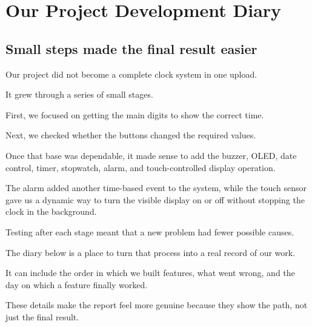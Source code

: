 \documentclass[12pt,letterpaper]{article}
\begin{document}
\clearpage
\section{Our Project Development Diary}

\subsection{Small steps made the final result easier}

Our project did not become a complete clock system
in one upload.

It grew through a series of small stages.

First,
we focused on getting the main digits
to show the correct time.

Next,
we checked whether the buttons changed
the required values.

Once that base was dependable,
it made sense to add the buzzer,
OLED,
date control,
timer,
stopwatch,
alarm,
and touch-controlled display operation.

The alarm added another time-based event to the system, while the touch
sensor gave us a dynamic way to turn the visible display on or off without
stopping the clock in the background.

Testing after each stage meant
that a new problem had fewer possible causes.

The diary below is a place to turn that process
into a real record of our work.

It can include the order
in which we built features,
what went wrong,
and the day on which a feature finally worked.

These details make the report feel more genuine
because they show the path,
not just the final result.
\end{document}
